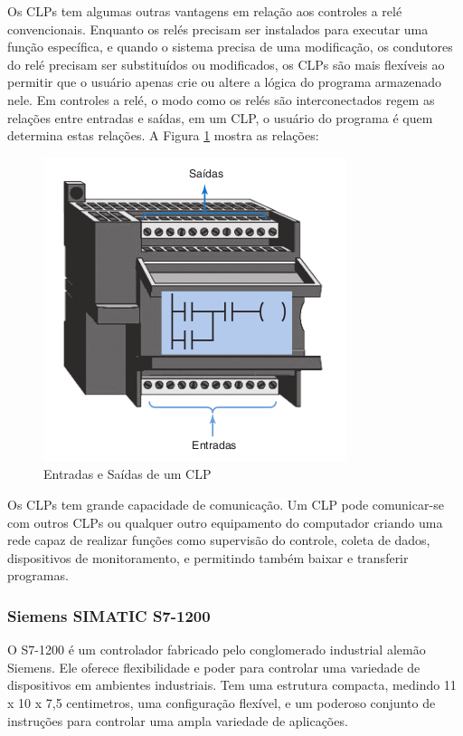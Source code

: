 \documentclass[a4paper, 12pt]{article}
\begin{document}
		Os CLPs tem algumas outras vantagens em relação aos controles a relé convencionais. Enquanto os relés
		precisam ser instalados para executar uma função específica, e quando o sistema precisa de uma modificação,
		os condutores do relé precisam ser substituídos ou modificados, os CLPs são mais flexíveis ao permitir
		que o usuário apenas crie ou altere a lógica do programa armazenado nele.
		Em controles a relé, o modo como os relés são interconectados regem as relações entre	entradas e saídas,
		em um CLP, o usuário do programa é quem determina estas relações. A Figura \ref{fig:clp-io-relation} mostra as relações:
	
		\begin{figure}[H]
			\centering
			\includegraphics[scale=0.5]{figures/CLPInputOutputRelation.png}
			\caption{Entradas e Saídas de um CLP}
			\label{fig:clp-io-relation}
		\end{figure}
	
		Os CLPs tem grande capacidade de comunicação. Um CLP pode comunicar-se com outros CLPs ou qualquer outro
		equipamento do computador criando uma rede capaz de realizar funções como supervisão do controle, coleta de dados,
		dispositivos de monitoramento, e permitindo também baixar e transferir programas.
	
		\subsubsection{Siemens SIMATIC S7-1200}
		
			O S7-1200 é um controlador fabricado pelo conglomerado industrial alemão Siemens. Ele oferece flexibilidade e poder
			para controlar uma variedade de dispositivos em ambientes industriais. Tem uma estrutura compacta, medindo 11 x 10 x 7,5 centimetros,
			uma configuração flexível, e um poderoso conjunto de instruções para controlar uma ampla variedade de aplicações.
		
\end{document}
